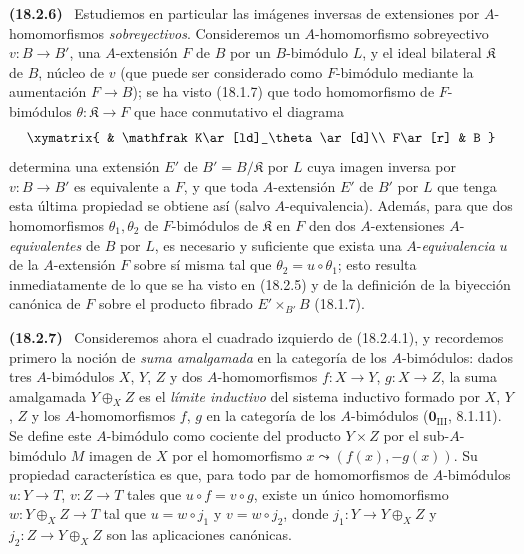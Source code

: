 \documentclass[10pt,oneside]{book}
\makeatletter
\newcommand{\setmanualcurrentlabel}[1]{\def\@currentlabel{#1}}
\newcommand{\oldpage}[2][]{%
  \setcounter{footnote}{0}%
  \marginpar{\scriptsize\textbf{#1}~|~#2}\ignorespaces}
\newenvironment{env}[1][]{\setmanualcurrentlabel{#1}\par\medskip\noindent\textbf{(#1)}\ }{\par}
\providecommand{\setmin}{-}%
\makeatother
\begin{document}
\begin{env}[18.2.6]
\label{0.18.2.6-es}
Estudiemos en particular las imágenes inversas de extensiones por
$A$-homomorfismos \emph{sobreyectivos}. Consideremos un $A$-homomorfismo
sobreyectivo $v:B\to B'$, una $A$-extensión $F$ de $B$ por un $B$-bimódulo $L$,
y el ideal bilateral $\mathfrak K$ de $B$, núcleo de $v$ (que puede ser
considerado como $F$-bimódulo mediante la aumentación $F\to B$); se ha visto
(18.1.7) que todo homomorfismo de $F$-bimódulos
$\theta:\mathfrak K\to F$ que hace conmutativo el diagrama
\[
  \xymatrix{
    & \mathfrak K\ar[ld]_\theta\ar[d]\\
    F\ar[r] & B
  }
\]
determina una extensión $E'$ de $B'=B/\mathfrak K$ por $L$ cuya imagen
inversa por $v:B\to B'$ es equivalente a $F$, y que toda $A$-extensión
$E'$ de $B'$ por $L$ que tenga esta última propiedad se obtiene así (salvo
$A$-equivalencia). Además, para que dos homomorfismos
$\theta_1,\theta_2$ de $F$-bimódulos de $\mathfrak K$ en $F$ den dos
  $A$-extensiones $A$-\emph{equivalentes} de $B$ por $L$, es necesario y suficiente que
exista una $A$-\emph{equivalencia} $u$ de la $A$-extensión $F$ sobre sí misma tal que
\oldpage[0\textsubscript{IV-1}]{57}
$\theta_2=u\circ\theta_1$; esto resulta inmediatamente de lo que se ha visto en
(18.2.5) y de la definición de la biyección canónica de $F$ sobre el producto
fibrado $E'\times_{B'}B$ (18.1.7).
\end{env}

\begin{env}[18.2.7]
\label{0.18.2.7-es}
Consideremos ahora el cuadrado izquierdo de (18.2.4.1), y recordemos primero
la noción de \emph{suma amalgamada} en la categoría de los $A$-bimódulos:
dados tres $A$-bimódulos $X$, $Y$, $Z$ y dos $A$-homomorfismos
$f:X\to Y$, $g:X\to Z$, la suma amalgamada $Y\oplus_XZ$ es el \emph{límite
inductivo} del sistema inductivo formado por $X$, $Y$, $Z$ y los
$A$-homomorfismos $f$, $g$ en la categoría de los $A$-bimódulos
($\mathbf{0}_{\mathrm{III}}$, 8.1.11). Se define este $A$-bimódulo como cociente del
producto $Y\times Z$ por el sub-$A$-bimódulo $M$ imagen de $X$ por
el homomorfismo $x\leadsto(f(x),\setmin g(x))$. Su propiedad característica es que,
para todo par de homomorfismos de $A$-bimódulos $u:Y\to T$, $v:Z\to T$
tales que $u\circ f=v\circ g$, existe un único homomorfismo
$w:Y\oplus_XZ\to T$ tal que $u=w\circ j_1$ y $v=w\circ j_2$, donde
$j_1:Y\to Y\oplus_XZ$ y $j_2:Z\to Y\oplus_XZ$ son las aplicaciones
canónicas.
\end{env}
\end{document}
